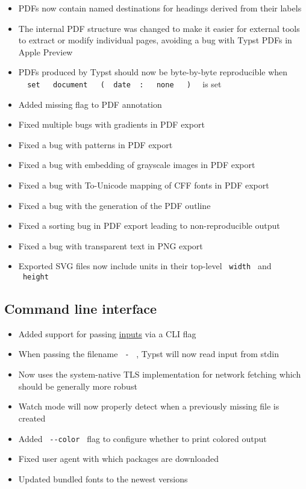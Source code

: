 \begin{itemize}
\tightlist
\item
  PDFs now contain named destinations for headings derived from their
  labels
\item
  The internal PDF structure was changed to make it easier for external
  tools to extract or modify individual pages, avoiding a bug with Typst
  PDFs in Apple Preview
\item
  PDFs produced by Typst should now be byte-by-byte reproducible when
  \texttt{\ }{\texttt{\ set\ }}\texttt{\ }{\texttt{\ document\ }}\texttt{\ }{\texttt{\ (\ }}\texttt{\ date\ }{\texttt{\ :\ }}\texttt{\ }{\texttt{\ none\ }}\texttt{\ }{\texttt{\ )\ }}\texttt{\ }
  is set
\item
  Added missing flag to PDF annotation
\item
  Fixed multiple bugs with gradients in PDF export
\item
  Fixed a bug with patterns in PDF export
\item
  Fixed a bug with embedding of grayscale images in PDF export
\item
  Fixed a bug with To-Unicode mapping of CFF fonts in PDF export
\item
  Fixed a bug with the generation of the PDF outline
\item
  Fixed a sorting bug in PDF export leading to non-reproducible output
\item
  Fixed a bug with transparent text in PNG export
\item
  Exported SVG files now include units in their top-level
  \texttt{\ width\ } and \texttt{\ height\ }
\end{itemize}

\subsection{Command line interface}\label{command-line-interface}

\begin{itemize}
\tightlist
\item
  Added support for passing
  \href{/docs/reference/foundations/sys/}{inputs} via a CLI flag
\item
  When passing the filename \texttt{\ -\ } , Typst will now read input
  from stdin
\item
  Now uses the system-native TLS implementation for network fetching
  which should be generally more robust
\item
  Watch mode will now properly detect when a previously missing file is
  created
\item
  Added \texttt{\ -\/-color\ } flag to configure whether to print
  colored output
\item
  Fixed user agent with which packages are downloaded
\item
  Updated bundled fonts to the newest versions
\end{itemize}

